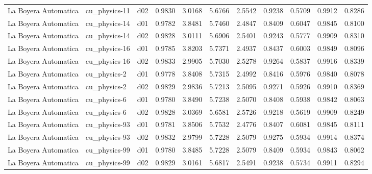 \begin{longtable}{lllrrrrrrrr}
 La Boyera Automatica  &         cu\_physics-11 &     d02 &   0.9830 &   3.0168 &   5.6766 &       2.5542 &        0.9238 &       0.5709 &           0.9912 &  0.8286 \\
 La Boyera Automatica  &         cu\_physics-14 &     d01 &   0.9782 &   3.8481 &   5.7460 &       2.4847 &        0.8409 &       0.6047 &           0.9845 &  0.8100 \\
 La Boyera Automatica  &         cu\_physics-14 &     d02 &   0.9828 &   3.0111 &   5.6906 &       2.5401 &        0.9243 &       0.5777 &           0.9909 &  0.8310 \\
 La Boyera Automatica  &         cu\_physics-16 &     d01 &   0.9785 &   3.8203 &   5.7371 &       2.4937 &        0.8437 &       0.6003 &           0.9849 &  0.8096 \\
 La Boyera Automatica  &         cu\_physics-16 &     d02 &   0.9833 &   2.9905 &   5.7030 &       2.5278 &        0.9264 &       0.5837 &           0.9916 &  0.8339 \\
 La Boyera Automatica  &          cu\_physics-2 &     d01 &   0.9778 &   3.8408 &   5.7315 &       2.4992 &        0.8416 &       0.5976 &           0.9840 &  0.8078 \\
 La Boyera Automatica  &          cu\_physics-2 &     d02 &   0.9829 &   2.9836 &   5.7213 &       2.5095 &        0.9271 &       0.5926 &           0.9910 &  0.8369 \\
 La Boyera Automatica  &          cu\_physics-6 &     d01 &   0.9780 &   3.8490 &   5.7238 &       2.5070 &        0.8408 &       0.5938 &           0.9842 &  0.8063 \\
 La Boyera Automatica  &          cu\_physics-6 &     d02 &   0.9828 &   3.0369 &   5.6581 &       2.5726 &        0.9218 &       0.5619 &           0.9909 &  0.8249 \\
 La Boyera Automatica  &         cu\_physics-93 &     d01 &   0.9781 &   3.8506 &   5.7532 &       2.4776 &        0.8407 &       0.6081 &           0.9845 &  0.8111 \\
 La Boyera Automatica  &         cu\_physics-93 &     d02 &   0.9832 &   2.9799 &   5.7228 &       2.5079 &        0.9275 &       0.5934 &           0.9914 &  0.8374 \\
 La Boyera Automatica  &         cu\_physics-99 &     d01 &   0.9780 &   3.8485 &   5.7228 &       2.5079 &        0.8409 &       0.5934 &           0.9843 &  0.8062 \\
 La Boyera Automatica  &         cu\_physics-99 &     d02 &   0.9829 &   3.0161 &   5.6817 &       2.5491 &        0.9238 &       0.5734 &           0.9911 &  0.8294 \\

\end{longtable}
